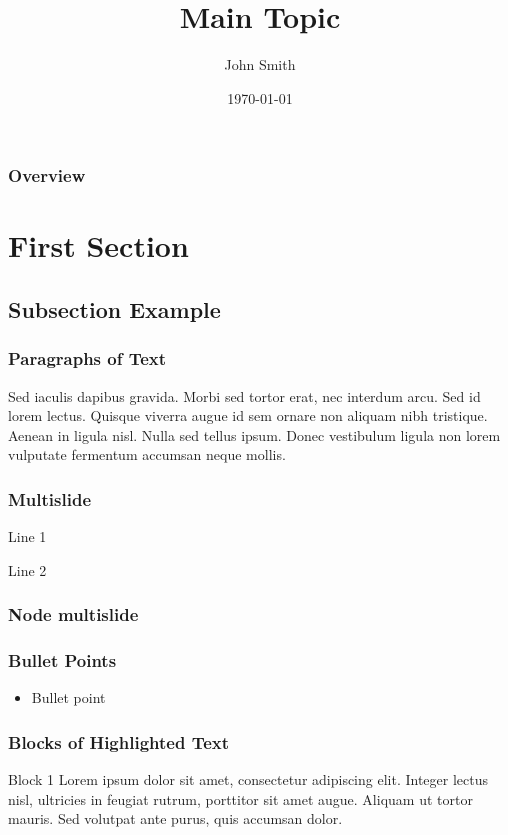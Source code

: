 \documentclass[usenames,dvipsnames]{beamer}
\title[Short title]{Main Topic } %
\author{John Smith}
\institute[UCLA]
{
University of California \\
\medskip
\textit{john@smith.com}
}
\date{\today}
\begin{document}
\begin{frame}
\titlepage
\end{frame}



\begin{frame}
\frametitle{Overview}
\tableofcontents
\end{frame}



\section{First Section}

\subsection{Subsection Example}

\begin{frame}
\frametitle{Paragraphs of Text}
Sed iaculis dapibus gravida. Morbi sed tortor erat, nec interdum arcu. Sed id lorem lectus. Quisque viverra augue id sem ornare non aliquam nibh tristique. Aenean in ligula nisl. Nulla sed tellus ipsum. Donec vestibulum ligula non lorem vulputate fermentum accumsan neque mollis.
\end{frame}

\begin{frame}
\frametitle{Multislide}
Line 1
\pause

Line 2
\pause
\end{frame}

\begin{frame}
\frametitle{Node multislide}
\end{frame}



\begin{frame}
\frametitle{Bullet Points}
\begin{itemize}
\item Bullet point
\end{itemize}
\end{frame}



\begin{frame}
\frametitle{Blocks of Highlighted Text}
\begin{block}{Block 1}
Lorem ipsum dolor sit amet, consectetur adipiscing elit. Integer lectus nisl, ultricies in feugiat rutrum, porttitor sit amet augue. Aliquam ut tortor mauris. Sed volutpat ante purus, quis accumsan dolor.
\end{block}
\end{frame}
\end{document}

